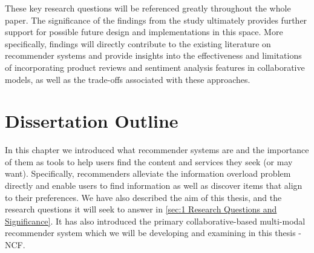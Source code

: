     
These key research questions will be referenced greatly throughout the whole paper. The significance of the findings from the study ultimately provides further support for possible future design and implementations in this space. More specifically, findings will directly contribute to the existing literature on recommender systems and provide insights into the effectiveness and limitations of incorporating product reviews and sentiment analysis features in collaborative models, as well as the trade-offs associated with these approaches.

\section{Dissertation Outline}
\label{sec:Dissertation Outline}

In this chapter we introduced what recommender systems are and the importance of them as tools to help users find the content and services they seek (or may want). Specifically, recommenders alleviate the information overload problem directly and enable users to find information as well as discover items that align to their preferences. We have also described the aim of this thesis, and the research questions it will seek to answer in \ref{sec:1 Research Questions and Significance}. It has also introduced the primary collaborative-based multi-modal recommender system which we will be developing and examining in this thesis - NCF. 

